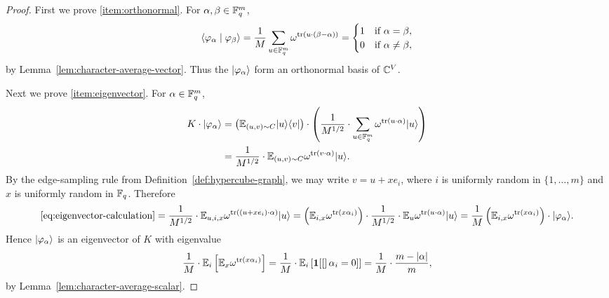 \begin{proof}
	\leanok
	First we prove \ref{item:orthonormal}. For $\alpha,\beta \in \mathbb{F}_q^m$,
	\[
		\langle \varphi_\alpha \mid \varphi_\beta \rangle
		=
		\frac{1}{M} \sum_{u \in \mathbb{F}_q^m} \omega^{\operatorname{tr}(u\cdot(\beta-\alpha))}
		=
		\begin{cases}
			1 & \text{if } \alpha=\beta,    \\
			0 & \text{if } \alpha\ne \beta,
		\end{cases}
	\]
	by Lemma~\ref{lem:character-average-vector}. Thus the $\lvert \varphi_\alpha \rangle$ form an orthonormal basis of $\mathbb{C}^V$.

	Next we prove \ref{item:eigenvector}. For $\alpha \in \mathbb{F}_q^m$,
	\begin{equation}
		\begin{aligned}
			K \cdot \lvert \varphi_\alpha \rangle
			 & =
			\left(\mathbb{E}_{(u,v)\sim C} \lvert u \rangle\langle v \rvert\right) \cdot \left(\frac{1}{M^{1/2}} \cdot \sum_{u \in \mathbb{F}_q^m} \omega^{\operatorname{tr}(u\cdot \alpha)} \lvert u \rangle\right) \\
			 & =
			\frac{1}{M^{1/2}} \cdot \mathbb{E}_{(u,v)\sim C} \omega^{\operatorname{tr}(v\cdot \alpha)} \lvert u \rangle.
		\end{aligned}
		\label{eq:eigenvector-calculation}
	\end{equation}
	By the edge-sampling rule from Definition~\ref{def:hypercube-graph}, we may write $v=u+x e_i$, where $i$ is uniformly random in $\{1,\dots,m\}$ and $x$ is uniformly random in $\mathbb{F}_q$. Therefore
	\[
		\eqref{eq:eigenvector-calculation}
		=
		\frac{1}{M^{1/2}} \cdot \mathbb{E}_{u,i,x} \omega^{\operatorname{tr}((u+x e_i)\cdot \alpha)} \lvert u \rangle
		=
		\left(\mathbb{E}_{i,x}\omega^{\operatorname{tr}(x\alpha_i)}\right) \cdot \frac{1}{M^{1/2}} \cdot \mathbb{E}_u \omega^{\operatorname{tr}(u\cdot \alpha)} \lvert u \rangle
		=
		\frac{1}{M}\left(\mathbb{E}_{i,x}\omega^{\operatorname{tr}(x\alpha_i)}\right) \cdot \lvert \varphi_\alpha \rangle.
	\]
	Hence $\lvert \varphi_\alpha \rangle$ is an eigenvector of $K$ with eigenvalue
	\[
		\frac{1}{M} \cdot \mathbb{E}_i \left[\mathbb{E}_x \omega^{\operatorname{tr}(x\alpha_i)}\right]
		=
		\frac{1}{M} \cdot \mathbb{E}_i \left[\mathbf{1}\!\left[[\right]\alpha_i=0]\right]
		=
		\frac{1}{M} \cdot \frac{m-|\alpha|}{m},
	\]
	by Lemma~\ref{lem:character-average-scalar}.
\end{proof}

